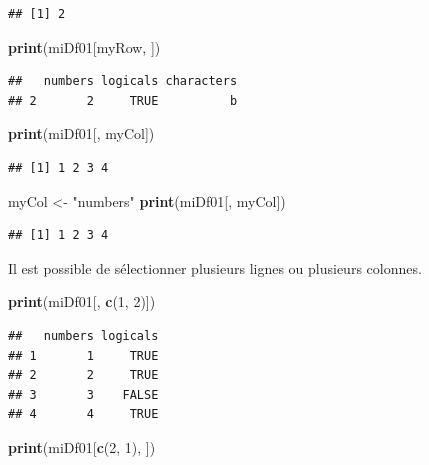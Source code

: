 \documentclass[twoside,symmetric]{book}
\newenvironment{Shaded}{}{}
\newcommand{\DecValTok}[1]{#1}
\newcommand{\KeywordTok}[1]{\textbf{#1}}
\newcommand{\NormalTok}[1]{#1}
\newcommand{\StringTok}[1]{#1}
\begin{document}
\begin{verbatim}
## [1] 2
\end{verbatim}

\begin{Shaded}
\begin{Highlighting}[]
\KeywordTok{print}\NormalTok{(miDf01[myRow, ])}
\end{Highlighting}
\end{Shaded}

\begin{verbatim}
##   numbers logicals characters
## 2       2     TRUE          b
\end{verbatim}

\begin{Shaded}
\begin{Highlighting}[]
\KeywordTok{print}\NormalTok{(miDf01[, myCol])}
\end{Highlighting}
\end{Shaded}

\begin{verbatim}
## [1] 1 2 3 4
\end{verbatim}

\begin{Shaded}
\begin{Highlighting}[]
\NormalTok{myCol <-}\StringTok{ "numbers"}
\KeywordTok{print}\NormalTok{(miDf01[, myCol])}
\end{Highlighting}
\end{Shaded}

\begin{verbatim}
## [1] 1 2 3 4
\end{verbatim}

Il est possible de sélectionner plusieurs lignes ou plusieurs colonnes.

\begin{Shaded}
\begin{Highlighting}[]
\KeywordTok{print}\NormalTok{(miDf01[, }\KeywordTok{c}\NormalTok{(}\DecValTok{1}\NormalTok{, }\DecValTok{2}\NormalTok{)])}
\end{Highlighting}
\end{Shaded}

\begin{verbatim}
##   numbers logicals
## 1       1     TRUE
## 2       2     TRUE
## 3       3    FALSE
## 4       4     TRUE
\end{verbatim}

\begin{Shaded}
\begin{Highlighting}[]
\KeywordTok{print}\NormalTok{(miDf01[}\KeywordTok{c}\NormalTok{(}\DecValTok{2}\NormalTok{, }\DecValTok{1}\NormalTok{), ])}
\end{Highlighting}
\end{Shaded}
\end{document}
